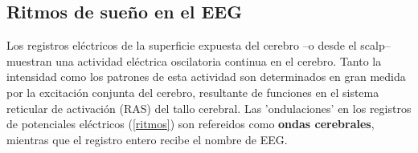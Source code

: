 

\subsection{Ritmos de sue\~no en el EEG}

Los registros el\'ectricos de la superficie expuesta del cerebro --o desde el scalp-- muestran una
actividad el\'ectrica oscilatoria continua en el cerebro. Tanto la intensidad como los patrones
de esta actividad son determinados en gran medida por la excitaci\'on conjunta del cerebro,
resultante de funciones en el sistema reticular de activaci\'on (RAS) del tallo cerebral.
Las 'ondulaciones' en los registros de potenciales el\'ectricos (\ref{ritmos})
son refereidos como \textbf{ondas cerebrales}, mientras que el registro entero recibe el nombre
de EEG.


